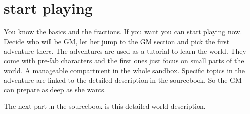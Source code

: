 \section{start playing}

You know the basics and the fractions. If you want you can start playing now. Decide who will be GM, let her jump to the GM section and pick the first adventure there.
The adventures are used as a tutorial to learn the world. They come with pre-fab characters and the first ones just focus on small parts of the world. A manageable compartment in the whole sandbox.
Specific topics in the adventure are linked to the detailed description in the sourcebook. So the GM can prepare as deep as she wants.

The next part in the sourcebook is this detailed world description.